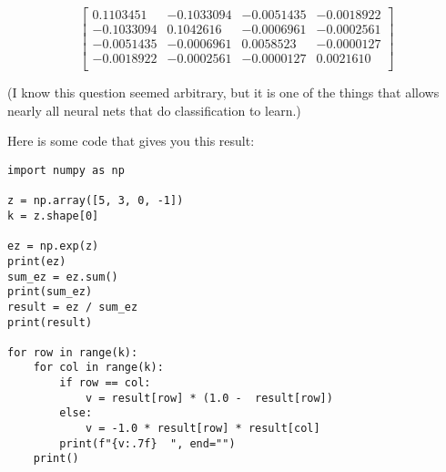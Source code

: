 \documentclass[11pt,english]{article}
\begin{document}
$$\begin{bmatrix}
0.1103451 & -0.1033094 & -0.0051435 & -0.0018922 \\
-0.1033094 & 0.1042616 & -0.0006961 & -0.0002561 \\
-0.0051435 & -0.0006961 & 0.0058523 & -0.0000127 \\
-0.0018922 & -0.0002561 & -0.0000127 & 0.0021610 \\
\end{bmatrix}$$

(I know this question seemed arbitrary,  but it is one of the things that allows nearly all neural nets that do classification  to learn.)

Here is some code that gives you this result:

\begin{verbatim}
import numpy as np

z = np.array([5, 3, 0, -1])
k = z.shape[0]

ez = np.exp(z)
print(ez)
sum_ez = ez.sum()
print(sum_ez)
result = ez / sum_ez
print(result)

for row in range(k):
    for col in range(k):
        if row == col:
            v = result[row] * (1.0 -  result[row])
        else:
            v = -1.0 * result[row] * result[col]
        print(f"{v:.7f}  ", end="")
    print()
\end{verbatim}
\end{document}
